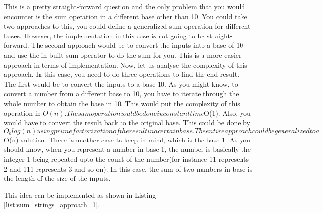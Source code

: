 This is a pretty straight-forward question and the only problem that you would encounter is the sum operation in a different base other than 10. You could take two approaches to this, you could define a generalized sum operation for different bases. However, the implementation in this case is not going to be straight-forward. The second approach would be to convert the inputs into a base of 10 and use the in-built sum operator to do the sum for you. This is a more easier approach in-terms of implementation. Now, let us analyse the complexity of this approach. In this case, you need to do three operations to find the end result. The first would be to convert the inputs to a base 10. As you might know, to convert a number from a different base to 10, you have to iterate through the whole number to obtain the base in 10. This would put the complexity of this operation in ${O(n)}. The sum operation could be done in constant time ${O(1)}. Also, you would have to convert the result back to the original base. This could be done by ${O_{b}log(n)} using prime factorization of the result in a certain base. The entire approach could be generalized to a ${O(n)} solution. There is another case to keep in mind, which is the base 1. As you should know, when you represent a number in base 1, the number is basically the integer 1 being repeated upto the count of the number(for instance 11 represents 2 and 111 represents 3 and so on). In this case, the sum of two numbers in base is the length of the size of the inputs. 

This idea can be implemented as shown in Listing \ref{list:sum_strings_approach_1}.

\begin{minipage}{\linewidth}
	
\end{minipage}